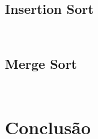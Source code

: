 \documentclass[12pt, oneside, a4paper,english,brazil]{abntex2}
\begin{document}
\section{Insertion Sort}
\inputminted{lean}{insertion_sort.lean}
\inputminted{lean}{insertion_sort_modified.lean}

\section{Merge Sort}

\inputminted{lean}{merge_sort.lean}
\inputminted{lean}{merge_sort_modified.lean}

\chapter{Conclus\~ao}

\postextual

% 

\end{document}
